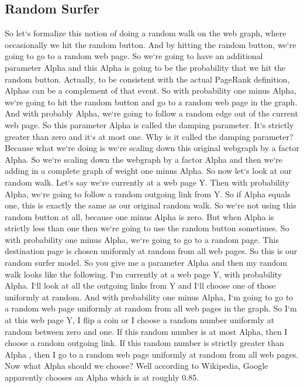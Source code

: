 \subsection{Random Surfer}
So let`s formalize this notion of doing a random walk on the web graph, where occasionally we hit the random button.
And by hitting the random button, we`re going to go to a random web page.
So we`re going to have an additional parameter Alpha and this Alpha is going to be the probability that we hit the random button.
Actually, to be consistent with the actual PageRank definition, Alphas can be a complement of that event.
So with probability one minus Alpha, we`re going to hit the random button and go to a random web page in the graph.
And with probably Alpha, we`re going to follow a random edge out of the current web page.
So this parameter Alpha is called the damping parameter.
It`s strictly greater than zero and it`s at most one.
Why is it called the damping parameter? Because what we`re doing is we`re scaling down this original webgraph by a factor Alpha.
So we`re scaling down the webgraph by a factor Alpha and then we`re adding in a complete graph of weight one minus Alpha.
So now let`s look at our random walk.
Let`s say we`re currently at a web page Y\@.
Then with probability Alpha, we`re going to follow a random outgoing link from Y\@.
So if Alpha equals one, this is exactly the same as our original random walk.
So we`re not using this random button at all, because one minus Alpha is zero.
But when Alpha is strictly less than one then we`re going to use the random button sometimes.
So with probability one minus Alpha, we`re going to go to a random page.
This destination page is chosen uniformly at random from all web pages.
So this is our random surfer model.
So you give me a parameter Alpha and then my random walk looks like the following.
I`m currently at a web page Y, with probability Alpha.
I`ll look at all the outgoing links from Y and I`ll choose one of those uniformly at random.
And with probability one minus Alpha, I`m going to go to a random web page uniformly at random from all web pages in the graph.
So I`m at this web page Y, I flip a coin or I choose a random number uniformly at random between zero and one.
If this random number is at most Alpha, then I choose a random outgoing link.
If this random number is strictly greater than Alpha , then I go to a random web page uniformly at random from all web pages.
Now what Alpha should we choose? Well according to Wikipedia, Google apparently chooses an Alpha which is at roughly 0.85.

